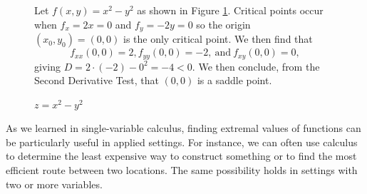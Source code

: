 \begin{figure}[ht]
  \begin{minipage}{3.75in}
    \begin{example} 
      Let $f(x,y) = x^2-y^2$ as
      shown in Figure \ref{F:10.7.saddle_2}.  Critical points occur when $f_x
      = 2x = 0$ and $f_y=-2y = 0$ so the origin $(x_0, y_0)= (0,0)$ is
      the only critical point.  We then find that
      $$
      f_{xx}(0,0) = 2, f_{yy}(0,0) = -2,\ \mbox{and} \ f_{xy}(0,0) = 0,
      $$
      giving $D = 2\cdot(-2) - 0^2 = -4 < 0$.  We then 
      conclude, from the Second Derivative
      Test, that $(0,0)$ is a saddle point.
    \end{example}
  \end{minipage}
  \hspace*{0.25in}
  \begin{minipage}[h]{2.5in}
    \begin{center}
      \caption{$z=x^2-y^2$}
      \label{F:10.7.saddle_2}
    \end{center}
  \end{minipage}
\end{figure}
  
\newpage



As we learned in single-variable calculus, finding extremal values of functions can be particularly useful in applied settings.  For instance, we can often use calculus to determine the least expensive
way to construct something or to find the most efficient route between two
locations.  The same possibility holds in settings with two or more variables.

